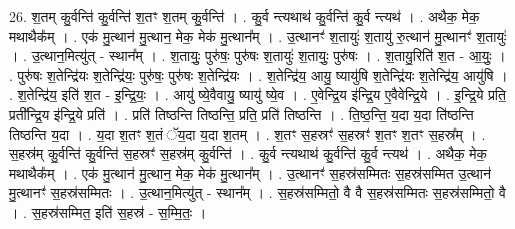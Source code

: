 \documentclass[17pt]{extarticle}
\begin{document}
26. श॒तम् कु॒र्वन्ति॑ कु॒र्वन्ति॑ श॒तꣳ श॒तम् कु॒र्वन्ति॑ । . कु॒र्व न्त्यथाथ॑ कु॒र्वन्ति॑ कु॒र्व न्त्यथ॑ । . अथैक॒ मेक॒ मथाथैक᳚म् । . एक॑ मु॒त्थान॑ मु॒त्थान॒ मेक॒ मेक॑ मु॒त्थान᳚म् । . उ॒त्थानꣳ॑ श॒तायुः॑ श॒तायु॑ रु॒त्थान॑ मु॒त्थानꣳ॑ श॒तायुः॑ । . उ॒त्थान॒मित्यु॑त् - स्थान᳚म् । . श॒तायुः॒ पुरु॑षः॒ पुरु॑षः श॒तायुः॑ श॒तायुः॒ पुरु॑षः । . श॒तायु॒रिति॑ श॒त - आ॒युः॒ । . पुरु॑षः श॒तेन्द्रि॑यः श॒तेन्द्रि॑यः॒ पुरु॑षः॒ पुरु॑षः श॒तेन्द्रि॑यः । . श॒तेन्द्रि॑य॒ आयु॒ ष्यायु॑षि श॒तेन्द्रि॑यः श॒तेन्द्रि॑य॒ आयु॑षि । . श॒तेन्द्रि॑य॒ इति॑ श॒त - इ॒न्द्रि॒यः॒ । . आयु॑ ष्ये॒वैवायु॒ ष्यायु॑ ष्ये॒व । . ए॒वेन्द्रि॒य इ॑न्द्रि॒य ए॒वैवेन्द्रि॒ये । . इ॒न्द्रि॒ये प्रति॒ प्रती᳚न्द्रि॒य इ॑न्द्रि॒ये प्रति॑ । . प्रति॑ तिष्ठन्ति तिष्ठन्ति॒ प्रति॒ प्रति॑ तिष्ठन्ति । . ति॒ष्ठ॒न्ति॒ य॒दा य॒दा ति॑ष्ठन्ति तिष्ठन्ति य॒दा । . य॒दा श॒तꣳ श॒तं ॅय॒दा य॒दा श॒तम् । . श॒तꣳ स॒हस्रꣳ॑ स॒हस्रꣳ॑ श॒तꣳ श॒तꣳ स॒हस्र᳚म् । . स॒हस्र॑म् कु॒र्वन्ति॑ कु॒र्वन्ति॑ स॒हस्रꣳ॑ स॒हस्र॑म् कु॒र्वन्ति॑ । . कु॒र्व न्त्यथाथ॑ कु॒र्वन्ति॑ कु॒र्व न्त्यथ॑ । . अथैक॒ मेक॒ मथाथैक᳚म् । . एक॑ मु॒त्थान॑ मु॒त्थान॒ मेक॒ मेक॑ मु॒त्थान᳚म् । . उ॒त्थानꣳ॑ स॒हस्र॑सम्मितः स॒हस्र॑सम्मित उ॒त्थान॑ मु॒त्थानꣳ॑ स॒हस्र॑सम्मितः । . उ॒त्थान॒मित्यु॑त् - स्थान᳚म् । . स॒हस्र॑सम्मितो॒ वै वै स॒हस्र॑सम्मितः स॒हस्र॑सम्मितो॒ वै । . स॒हस्र॑सम्मित॒ इति॑ स॒हस्र॑ - स॒म्मि॒तः॒ । \newline
\end{document}

